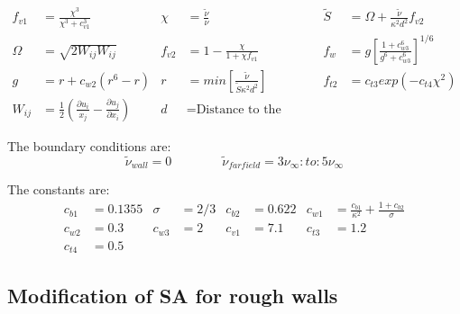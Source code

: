 \begin{align}
  f_{v1} &= \frac{\chi^{3}}{\chi^{3} + c_{v1}^{3}} &
  \chi &= \frac{\tilde \nu}{\nu} &
  \tilde S &= \Omega + \frac{\tilde \nu}{\kappa^{2} d^{2}} f_{v2} \\
  \Omega &= \sqrt{2W_{ij}W_{ij}} &
  f_{v2} &= 1 - \frac{\chi}{1 + \chi f_{v1}} &
  f_{w} &= g \left[ \frac{1 + c_{w3}^{6}}{g^{6} + c_{w3}^{6}} \right] ^{1/6} \\
  g &= r + c_{w2}(r^{6} -r) &
  r &= min \left[ \frac{\tilde \nu}{\tilde S \kappa^{2} d^{2}} \right] &
  f_{t2} &= c_{t3} exp(-c_{t4} \chi^{2}) \\
  W_{ij} &= \frac{1}{2} \left( \frac{\partial u_{i}}{x_{j}} - \frac{\partial u_{j}}{\partial x_{i}}\right) &
  d &= \text{Distance to the nearest wall}
\end{align}

\noindent The boundary conditions are:
\begin{equation}
  \tilde \nu_{wall} = 0
  \qquad \qquad
  \tilde \nu_{farfield} = 3\nu_{\infty} :to: 5\nu_{\infty}
\end{equation}

\noindent The constants are:
\begin{align*}
  c_{b1} &= 0.1355 &
  \sigma &= 2/3 &
  c_{b2} &= 0.622 &
  c_{w1} &= \frac{c_{b1}}{\kappa^{2}} + \frac{1 + c_{b2}}{\sigma} \\
  c_{w2} &= 0.3 &
  c_{w3} &= 2 &
  c_{v1} &= 7.1 &
  c_{t3} &= 1.2 \\
  c_{t4} &= 0.5
\end{align*}


\subsection{Modification of SA for rough walls}
